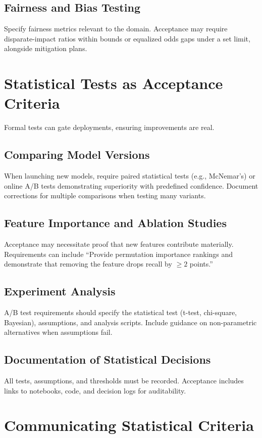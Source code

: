\subsection{Fairness and Bias Testing}
Specify fairness metrics relevant to the domain. Acceptance may require disparate-impact ratios within bounds or equalized odds gaps under a set limit, alongside mitigation plans.

\section{Statistical Tests as Acceptance Criteria}
\label{sec:statistical-tests}

Formal tests can gate deployments, ensuring improvements are real.

\subsection{Comparing Model Versions}
When launching new models, require paired statistical tests (e.g., McNemar's) or online A/B tests demonstrating superiority with predefined confidence. Document corrections for multiple comparisons when testing many variants.

\subsection{Feature Importance and Ablation Studies}
Acceptance may necessitate proof that new features contribute materially. Requirements can include ``Provide permutation importance rankings and demonstrate that removing the feature drops recall by $\ge 2$ points.''

\subsection{Experiment Analysis}
A/B test requirements should specify the statistical test (t-test, chi-square, Bayesian), assumptions, and analysis scripts. Include guidance on non-parametric alternatives when assumptions fail.

\subsection{Documentation of Statistical Decisions}
All tests, assumptions, and thresholds must be recorded. Acceptance includes links to notebooks, code, and decision logs for auditability.

\section{Communicating Statistical Criteria}
\label{sec:communicating-stats}

